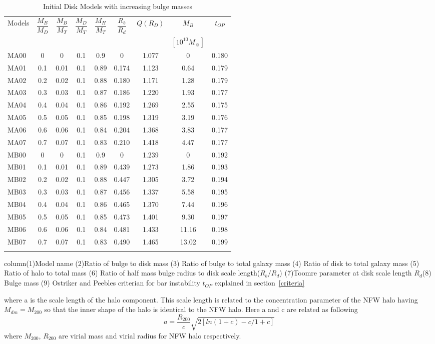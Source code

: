 \documentclass[a4paper,fleqn,usenatbib,useAMS]{mnras}
\begin{document}
\begin{table*}
 \caption{Initial Disk Models with increasing bulge masses}
\label{tab:Model Galaxy}
 \begin{tabular}{lcccccccc}
 \hline
 
Models & $\dfrac{M_{B}}{M_{D}}$ & $\dfrac{M_B}{M_T}$ & $\dfrac{M_D}{M_T}$&  $\dfrac{M_H}{M_T}$& $\dfrac{R_b}{R_d}$ & $Q(R_{D})$ &$M_{B}$ & $t_{OP}$\\
   & & & & & & & $[10^{10} M_{\sun}]$ &\\
  \hline
  MA00 &0 & 0&  0.1&0.9 & 0 & 1.077 & 0 &0.180    \\
  MA01 &0.1 &0.01 &0.1&0.89 & 0.174&1.123&0.64 &0.179  \\
  MA02 & 0.2&0.02 & 0.1& 0.88& 0.180&1.171 & 1.28 &0.179  \\
  MA03 & 0.3& 0.03 &0.1 & 0.87&0.186& 1.220 & 1.93 &0.177  \\
  MA04 &0.4 &0.04 & 0.1& 0.86& 0.192&1.269 & 2.55 &0.175  \\
  MA05 & 0.5&0.05 & 0.1& 0.85& 0.198&1.319 & 3.19 &0.176  \\
  MA06 &0.6 & 0.06 & 0.1 & 0.84& 0.204&1.368 & 3.83&0.177  \\
  MA07 &0.7 &0.07 & 0.1 & 0.83&0.210&1.418 & 4.47 &0.177  \\
  \hline
  MB00 &0 & 0& 0.1& 0.9 & 0 & 1.239 & 0 &0.192\\
  MB01 &0.1 &0.01 &0.1 &0.89 & 0.439&1.273 & 1.86&0.193\\
  MB02 & 0.2&0.02 &0.1 &0.88 & 0.447&1.305 & 3.72&0.194\\
  MB03 & 0.3& 0.03 & 0.1&0.87 &0.456& 1.337 & 5.58&0.195 \\
  MB04 &0.4 &0.04 & 0.1&0.86 & 0.465&1.370 & 7.44&0.196\\
  MB05 & 0.5&0.05 &0.1 &0.85 & 0.473&1.401 & 9.30&0.197\\
  MB06 &0.6 & 0.06 &0.1 &0.84 & 0.481&1.433 & 11.16&0.198\\
  MB07 &0.7 &0.07 &0.1 &0.83 &0.490&1.465 & 13.02&0.199\\
  \hline
  \label{table:Models}
   \end{tabular}
\begin{flushleft}
column(1)Model name (2)Ratio of bulge to disk mass (3) Ratio of bulge to total galaxy mass (4) Ratio of disk to total galaxy mass (5) Ratio of halo to total mass (6) Ratio of half mass bulge radius to disk scale length($R_{b}/R_{d}$) (7)Toomre parameter at disk scale length $R_d$(8) Bulge mass (9) Ostriker and Peebles criterian for bar instability $t_{OP}$ explained in section~\ref{criteria} 
\end{flushleft}   

\end{table*}
where a is the scale length of the halo component. This scale length is related to the concentration parameter of the NFW halo having $M_{dm}=M_{200}$ \citep{54a} so that the inner shape of the halo is identical to the NFW halo. Here a and c are related as following
\begin{equation}
a=\dfrac{R_{200}}{c} \sqrt{2[ln(1+c)- c/1+c]}
\end{equation}
where $M_{200}$, $R_{200}$ are virial mass and virial radius for NFW halo respectively. 
\end{document}
